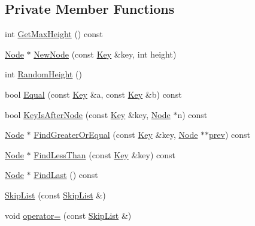\subsection*{Private Member Functions}
\begin{DoxyCompactItemize}
\item 
int \hyperlink{classleveldb_1_1_skip_list_a7820710f000cf55fc053b50e683a8bab}{Get\-Max\-Height} () const 
\item 
\hyperlink{structleveldb_1_1_skip_list_1_1_node}{Node} $\ast$ \hyperlink{classleveldb_1_1_skip_list_a23405bab83b4d978887961deff9d0463}{New\-Node} (const \hyperlink{namespaceleveldb_a7e9a9725b13fa0bd922d885280dfab95}{Key} \&key, int height)
\item 
int \hyperlink{classleveldb_1_1_skip_list_a43d757e80d1a4f36c97dbb43ca92cbfc}{Random\-Height} ()
\item 
bool \hyperlink{classleveldb_1_1_skip_list_a3e92dac7be899964ee57e2d81593c55f}{Equal} (const \hyperlink{namespaceleveldb_a7e9a9725b13fa0bd922d885280dfab95}{Key} \&a, const \hyperlink{namespaceleveldb_a7e9a9725b13fa0bd922d885280dfab95}{Key} \&b) const 
\item 
bool \hyperlink{classleveldb_1_1_skip_list_a24eabc6719de6d2df1d9f104667b84d5}{Key\-Is\-After\-Node} (const \hyperlink{namespaceleveldb_a7e9a9725b13fa0bd922d885280dfab95}{Key} \&key, \hyperlink{structleveldb_1_1_skip_list_1_1_node}{Node} $\ast$n) const 
\item 
\hyperlink{structleveldb_1_1_skip_list_1_1_node}{Node} $\ast$ \hyperlink{classleveldb_1_1_skip_list_a6b9fbc50fe94ffc52c2db181ecd32a97}{Find\-Greater\-Or\-Equal} (const \hyperlink{namespaceleveldb_a7e9a9725b13fa0bd922d885280dfab95}{Key} \&key, \hyperlink{structleveldb_1_1_skip_list_1_1_node}{Node} $\ast$$\ast$\hyperlink{cache_8cc_aabbd2f01bb8ec4a7a0128bce5f8cdb1b}{prev}) const 
\item 
\hyperlink{structleveldb_1_1_skip_list_1_1_node}{Node} $\ast$ \hyperlink{classleveldb_1_1_skip_list_af276177e6a17c21a7a26f425eefc46e3}{Find\-Less\-Than} (const \hyperlink{namespaceleveldb_a7e9a9725b13fa0bd922d885280dfab95}{Key} \&key) const 
\item 
\hyperlink{structleveldb_1_1_skip_list_1_1_node}{Node} $\ast$ \hyperlink{classleveldb_1_1_skip_list_acfda915a018c2f918477f48cf12bcc10}{Find\-Last} () const 
\item 
\hyperlink{classleveldb_1_1_skip_list_afb4f491cba16d06b82e96ac6bfcb5fb7}{Skip\-List} (const \hyperlink{classleveldb_1_1_skip_list}{Skip\-List} \&)
\item 
void \hyperlink{classleveldb_1_1_skip_list_a0185293e08c7e581693ba7491298cda9}{operator=} (const \hyperlink{classleveldb_1_1_skip_list}{Skip\-List} \&)
\end{DoxyCompactItemize}
